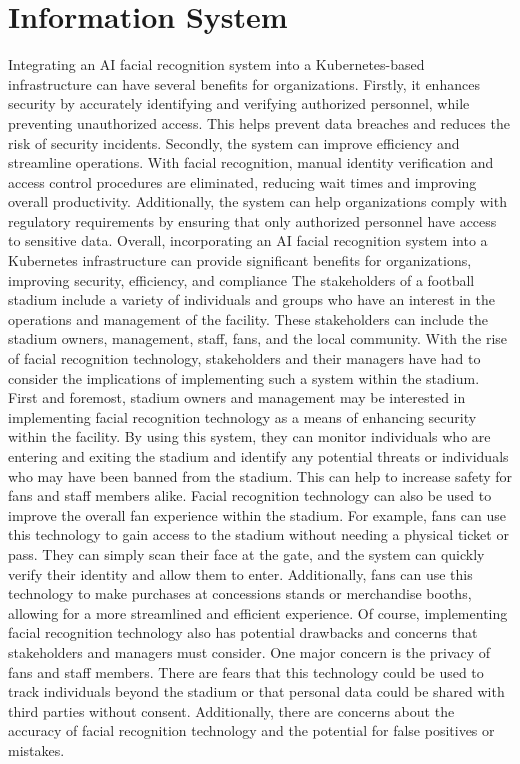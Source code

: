 \section{Information System}
Integrating an AI facial recognition system into a Kubernetes-based infrastructure can have several benefits for organizations. Firstly, it enhances security by accurately identifying and verifying authorized personnel, while preventing unauthorized access. This helps prevent data breaches and reduces the risk of security incidents.
Secondly, the system can improve efficiency and streamline operations. With facial recognition, manual identity verification and access control procedures are eliminated, reducing wait times and improving overall productivity. Additionally, the system can help organizations comply with regulatory requirements by ensuring that only authorized personnel have access to sensitive data.
Overall, incorporating an AI facial recognition system into a Kubernetes infrastructure can provide significant benefits for organizations, improving security, efficiency, and compliance
The stakeholders of a football stadium include a variety of individuals and groups who have an interest in the operations and management of the facility. These stakeholders can include the stadium owners, management, staff, fans, and the local community. With the rise of facial recognition technology, stakeholders and their managers have had to consider the implications of implementing such a system within the stadium.
First and foremost, stadium owners and management may be interested in implementing facial recognition technology as a means of enhancing security within the facility. By using this system, they can monitor individuals who are entering and exiting the stadium and identify any potential threats or individuals who may have been banned from the stadium. This can help to increase safety for fans and staff members alike.
Facial recognition technology can also be used to improve the overall fan experience within the stadium. For example, fans can use this technology to gain access to the stadium without needing a physical ticket or pass. They can simply scan their face at the gate, and the system can quickly verify their identity and allow them to enter. Additionally, fans can use this technology to make purchases at concessions stands or merchandise booths, allowing for a more streamlined and efficient experience.
Of course, implementing facial recognition technology also has potential drawbacks and concerns that stakeholders and managers must consider. One major concern is the privacy of fans and staff members. There are fears that this technology could be used to track individuals beyond the stadium or that personal data could be shared with third parties without consent. Additionally, there are concerns about the accuracy of facial recognition technology and the potential for false positives or mistakes.
